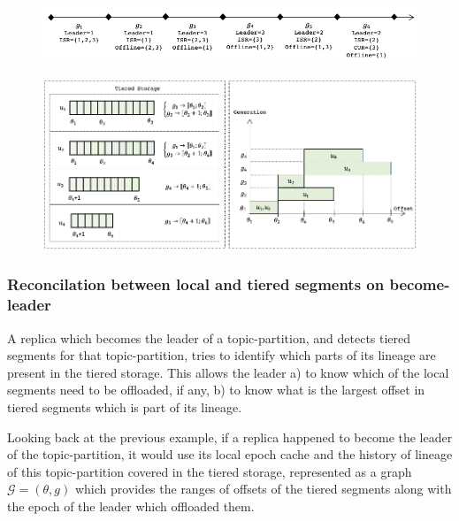 \documentclass{article}
\begin{document}
\begin{figure}[h!]
	\centering
	\includegraphics[scale=0.6]{seq-generations.png}
	\label{fig:seq-generations}
\end{figure}

\begin{figure}[h!]
	\centering
	\includegraphics[scale=0.6]{tiered-storage.png}
	\label{fig:tiered-storage}
\end{figure}

\subsubsection{Reconcilation between local and tiered segments on become-leader}

A replica which becomes the leader of a topic-partition, and detects tiered segments for that topic-partition, tries to identify which parts of its lineage are present in the tiered storage. This allows the leader a) to know which of the local segments need to be offloaded, if any, b) to know what is the largest offset in tiered segments which is part of its lineage.

Looking back at the previous example, if a replica happened to become the leader of the topic-partition, it would use its local epoch cache and the history of lineage of this topic-partition covered in the tiered storage, represented as a graph $\mathcal{G}=(\theta,g)$ which provides the ranges of offsets of the tiered segments along with the epoch of the leader which offloaded them.
\end{document}
